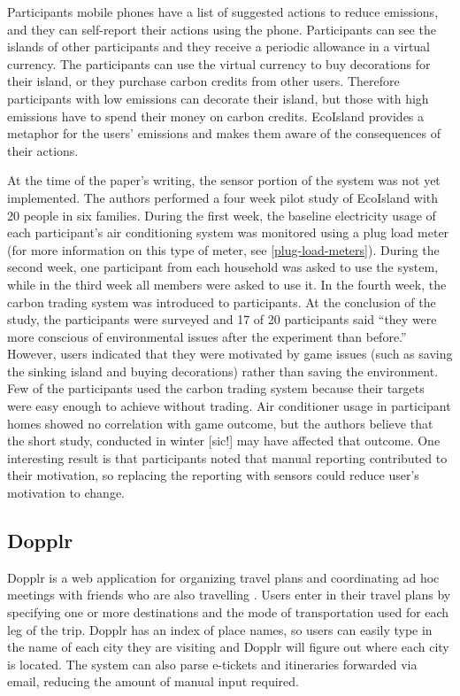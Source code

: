 Participants mobile phones have a list of suggested actions to reduce emissions, and they can self-report their actions using the phone. Participants can see the islands of other participants and they receive a periodic allowance in a virtual currency. The participants can use the virtual currency to buy decorations for their island, or they purchase carbon credits from other users. Therefore participants with low emissions can decorate their island, but those with high emissions have to spend their money on carbon credits. EcoIsland provides a metaphor for the users' emissions and makes them aware of the consequences of their actions.

At the time of the paper's writing, the sensor portion of the system was not yet implemented. The authors performed a four week pilot study of EcoIsland with 20 people in six families. During the first week, the baseline electricity usage of each participant's air conditioning system was monitored using a plug load meter (for more information on this type of meter, see \autoref{plug-load-meters}). During the second week, one participant from each household was asked to use the system, while in the third week all members were asked to use it. In the fourth week, the carbon trading system was introduced to participants. At the conclusion of the study, the participants were surveyed and 17 of 20 participants said ``they were more conscious of environmental issues after the experiment than before.'' However, users indicated that they were motivated by game issues (such as saving the sinking island and buying decorations) rather than saving the environment. Few of the participants used the carbon trading system because their targets were easy enough to achieve without trading. Air conditioner usage in participant homes showed no correlation with game outcome, but the authors believe that the short study, conducted in winter [sic!] may have affected that outcome. One interesting result is that participants noted that manual reporting contributed to their motivation, so replacing the reporting with sensors could reduce user's motivation to change.

\subsection{Dopplr}
\label{sec:dopplr}
Dopplr is a web application for organizing travel plans and coordinating ad hoc meetings with friends who are also travelling \cite{dopplr-website}. Users enter in their travel plans by specifying one or more destinations and the mode of transportation used for each leg of the trip. Dopplr has an index of place names, so users can easily type in the name of each city they are visiting and Dopplr will figure out where each city is located. The system can also parse e-tickets and itineraries forwarded via email, reducing the amount of manual input required.

